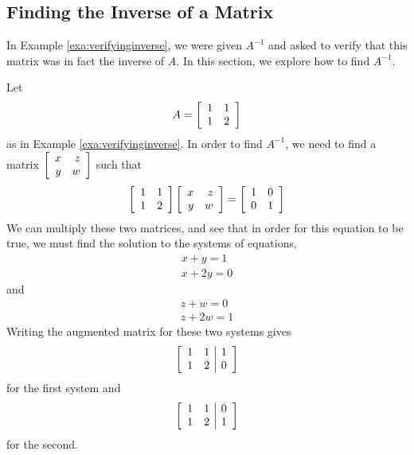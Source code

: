 
\subsection{Finding the Inverse of a Matrix}

In Example \ref{exa:verifyinginverse}, we were given $A^{-1}$ and asked to verify that this matrix
was in fact the inverse of $A$. In this section, we explore how to find $A^{-1}$. 

Let 
\begin{equation*}
A=\left[
\begin{array}{rr}
1 & 1 \\
1 & 2
\end{array}
\right]
\end{equation*}
as in Example \ref{exa:verifyinginverse}. 
In order to find $A^{-1}$, we need to find
a matrix $\left[
\begin{array}{rr}
x & z \\
y & w
\end{array}
\right] $ such that
\begin{equation*}
\left[
\begin{array}{rr}
1 & 1 \\
1 & 2
\end{array}
\right] \left[
\begin{array}{rr}
x & z \\
y & w
\end{array}
\right] =\left[
\begin{array}{rr}
1 & 0 \\
0 & 1
\end{array}
\right] 
\end{equation*}
We can multiply these two matrices, and see that in order for this equation to be true, we must find the solution to the systems of equations,
\begin{equation*}
\begin{array}{c}
x+y=1 \\
x+2y=0
\end{array}
\end{equation*}
and
\begin{equation*}
\begin{array}{c}
z+w=0 \\
z+2w=1
\end{array}
\end{equation*}
Writing the augmented matrix for these two systems gives
\begin{equation*}
\left[
\begin{array}{rr|r}
1 & 1 & 1 \\
1 & 2 & 0
\end{array}
\right]  
\label{inverse1a}
\end{equation*}
for the first system and
\begin{equation}
\left[
\begin{array}{rr|r}
1 & 1 & 0 \\
1 & 2 & 1
\end{array}
\right]  \label{inverse2a}
\end{equation}
for the second. 

